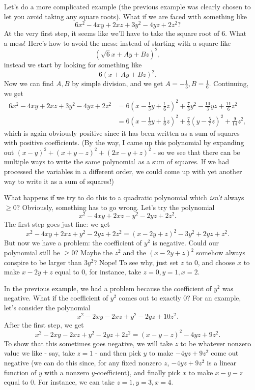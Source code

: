 \documentclass[letterpaper,11pt]{article}
\begin{document}
Let's do a more complicated example (the previous example was clearly chosen to let you avoid taking any square roots). What if we are faced with something like
\[
6x^2 - 4xy + 2xz + 3y^2 - 4yz + 2z^2?
\]
At the very first step, it seems like we'll have to take the square root of $6$. What a mess! Here's how to avoid the mess: instead of starting with a square like
\[
(\sqrt{6}x + Ay + Bz)^2,
\]
instead we start by looking for something like
\[
6(x + Ay + Bz)^2.
\]
Now we can find $A, B$ by simple division, and we get $A = -\frac{1}{3}, B = \frac{1}{6}$. Continuing, we get
\begin{align*}
6x^2 - 4xy + 2xz + 3y^2 - 4yz + 2z^2 &= 6(x - \tfrac{1}{3}y + \tfrac{1}{6}z)^2 + \tfrac{7}{3}y^2 - \tfrac{10}{3}yz + \tfrac{11}{6}z^2\\
&= 6(x - \tfrac{1}{3}y + \tfrac{1}{6}z)^2 + \tfrac{7}{3}(y - \tfrac{5}{7}z)^2 + \tfrac{9}{14}z^2,
\end{align*}
which is again obviously positive since it has been written as a sum of squares with positive coefficients. (By the way, I came up this polynomial by expanding out $(x-y)^2 + (x+y-z)^2 + (2x-y+z)^2$ - so we see that there can be multiple ways to write the same polynomial as a sum of squares. If we had processed the variables in a different order, we could come up with yet another way to write it as a sum of squares!)

What happens if we try to do this to a quadratic polynomial which \emph{isn't} always $\ge 0$? Obviously, something has to go wrong. Let's try the polynomial
\[
x^2 - 4xy + 2xz + y^2 - 2yz + 2z^2.
\]
The first step goes just fine: we get
\[
x^2 - 4xy + 2xz + y^2 - 2yz + 2z^2 = (x - 2y + z)^2 - 3y^2 + 2yz + z^2.
\]
But now we have a problem: the coefficient of $y^2$ is negative. Could our polynomial still be $\ge 0$? Maybe the $z^2$ and the $(x - 2y + z)^2$ somehow always conspire to be larger than $3y^2$? Nope! To see why, just set $z$ to $0$, and choose $x$ to make $x - 2y + z$ equal to $0$, for instance, take $z = 0, y = 1, x = 2$.

In the previous example, we had a problem because the coefficient of $y^2$ was negative. What if the coefficient of $y^2$ comes out to exactly $0$? For an example, let's consider the polynomial
\[
x^2 - 2xy - 2xz + y^2 - 2yz + 10z^2.
\]
After the first step, we get
\[
x^2 - 2xy - 2xz + y^2 - 2yz + 2z^2 = (x - y - z)^2 - 4yz + 9z^2.
\]
To show that this sometimes goes negative, we will take $z$ to be whatever nonzero value we like - say, take $z = 1$ - and then pick $y$ to make $-4yz + 9z^2$ come out negative (we can do this since, for any fixed nonzero $z$, $-4yz + 9z^2$ is a linear function of $y$ with a nonzero $y$-coefficient), and finally pick $x$ to make $x-y-z$ equal to $0$. For instance, we can take $z = 1, y = 3, x = 4$.
\end{document}
